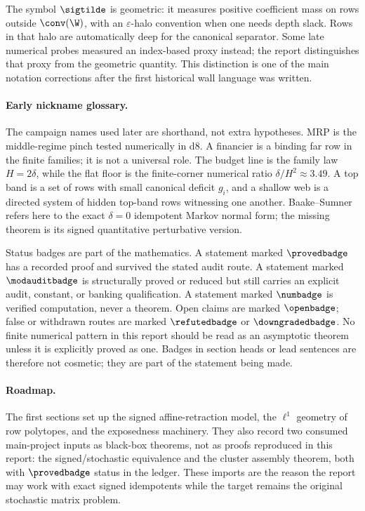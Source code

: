 The symbol \(\sigtilde\) is geometric: it measures positive coefficient mass
on rows outside \(\conv(\W)\), with an \(\varepsilon\)-halo convention when
one needs depth slack.  Rows in that halo are automatically deep for the
canonical separator.  Some late numerical probes measured an index-based proxy
instead; the report distinguishes that proxy from the geometric quantity.
This distinction is one of the main notation corrections after the first
historical wall language was written.

\paragraph{Early nickname glossary.}
The campaign names used later are shorthand, not extra hypotheses.  MRP is the
middle-regime pinch tested numerically in d8.  A financier is a binding far row
in the finite families; it is not a universal role.  The budget line is the
family law \(H=2\delta\), while the flat floor is the finite-corner numerical
ratio \(\delta/H^2\approx3.49\).  A top band is a set of rows with small
canonical deficit \(g_i\), and a shallow web is a directed system of hidden
top-band rows witnessing one another.  Baake--Sumner refers here to the exact
\(\delta=0\) idempotent Markov normal form; the missing theorem is its signed
quantitative perturbative version.

Status badges are part of the mathematics.  A statement marked
\(\provedbadge\) has a recorded proof and survived the stated audit route.
A statement marked \(\modauditbadge\) is structurally proved or reduced but
still carries an explicit audit, constant, or banking qualification.
A statement marked \(\numbadge\) is verified computation, never a theorem.
Open claims are marked \(\openbadge\); false or withdrawn routes are marked
\(\refutedbadge\) or \(\downgradedbadge\).  No finite numerical pattern in this
report should be read as an asymptotic theorem unless it is explicitly proved
as one.  Badges in section heads or lead sentences are therefore not cosmetic;
they are part of the statement being made.

\paragraph{Roadmap.}
The first sections set up the signed affine-retraction model, the
\(\ell^1\) geometry of row polytopes, and the exposedness machinery.  They
also record two consumed main-project inputs as black-box theorems, not as
proofs reproduced in this report: the signed/stochastic equivalence and the
cluster assembly theorem, both with \(\provedbadge\) status in the ledger.
These imports are the reason the report may work with exact signed
idempotents while the target remains the original stochastic matrix problem.

